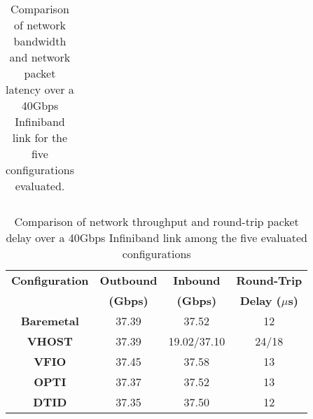 {\begin{table}[tbp]
\begin{tabular}{|l|l|l|l|}
\end{tabular}
\caption{Comparison of network bandwidth and network packet latency over a
40Gbps Infiniband link for the five configurations evaluated.}
\label{tab:network_performance}
\end{table}
}

\begin{table}
\renewcommand{\arraystretch}{1.2}
\small
\begin{center}
\begin{tabular}{|c|c|c|c|} \hline
{\bf Configuration} & {\bf Outbound} & {\bf Inbound}  & {\bf Round-Trip} \\ 
 & {\bf (Gbps)} & {\bf (Gbps)} & {\bf Delay ($\mu$s)} \\ \hline
 {\bf Baremetal}  & 37.39 & 37.52 & 12\\ \hline
 {\bf VHOST} & 37.39 & 19.02/37.10 & 24/18\\ \hline
{\bf VFIO}  & 37.45 & 37.58 & 13\\ \hline
 {\bf OPTI} & 37.37 & 37.52 & 13\\ \hline
 {\bf DTID} & 37.35 & 37.50 & 12\\ \hline
\end{tabular}
\end{center}
\vspace{-0.1in}
\caption{Comparison of network throughput and round-trip packet delay over a
40Gbps Infiniband link among the five evaluated configurations}
\label{tab:network_performance}
\vspace{-0.1in}
\end{table}


